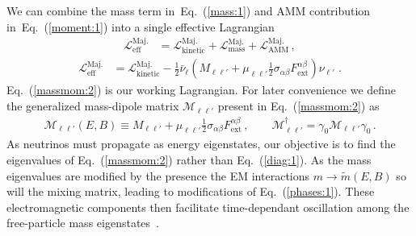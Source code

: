 \documentclass{ws-ijmpa}
\newcommand{\req}[1]{Eq.~(\ref{#1})}
\begin{document}
We can combine the mass term in~\req{mass:1} and AMM contribution in~\req{moment:1} into a single effective Lagrangian
\begin{align}
\label{massmom:1}
\mathcal{L}_\mathrm{eff}^\mathrm{Maj.} &= \mathcal{L}_\mathrm{kinetic}^\mathrm{Maj.} + \mathcal{L}_\mathrm{mass}^\mathrm{Maj.} + \mathcal{L}_\mathrm{AMM}^\mathrm{Maj.}\,,
\end{align}
%
\begin{align}
\label{massmom:2}
\mathcal{L}_\mathrm{eff}^\mathrm{Maj.} &= \mathcal{L}_\mathrm{kinetic}^\mathrm{Maj.} - \frac{1}{2}\bar\nu_{\ell}\left(M_{\ell\ell'}+\mu_{\ell\ell'}\frac{1}{2}\sigma_{\alpha\beta}F^{\alpha\beta}_\mathrm{ext}\right)\nu_{\ell'}\;.
\end{align}
\req{massmom:2} is our working Lagrangian. For later convenience we define the generalized mass-dipole matrix $\mathcal{M}_{\ell\ell'}$ present in \req{massmom:2} as
\begin{align}
\label{massmom:3}
\mathcal{M}_{\ell\ell'}(E,B)\equiv M_{\ell\ell'}+\mu_{\ell\ell'}\frac{1}{2}\sigma_{\alpha\beta}F^{\alpha\beta}_\mathrm{ext}\,,\qquad \mathcal{M}_{\ell\ell'}^{\dag}=\gamma_{0}\mathcal{M}_{\ell\ell'}\gamma_{0}\,.
\end{align}
As neutrinos must propagate as energy eigenstates, our objective is to find the eigenvalues of \req{massmom:2} rather than \req{diag:1}. As the mass eigenvalues are modified by the presence the EM interactions $m\rightarrow\widetilde m(E,B)$ so will the mixing matrix, leading to modifications of \req{phases:1}. These electromagnetic components then facilitate time-dependant oscillation among the free-particle mass eigenstates~\cite{Giunti:2014ixa}.

\end{document}
